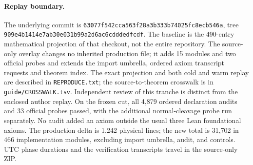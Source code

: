 \documentclass[11pt]{article}
\begin{document}
\paragraph{Replay boundary.}
The underlying commit is \texttt{63077f542cca563f28a3b333b74025fc8ecb546a}, tree
\texttt{909e4b1414e7ab30e031b99a2d6ac6cdddedfcdf}. The baseline is the 490-entry mathematical projection of that checkout, not the entire repository. The source-only overlay changes no inherited production file; it adds 15 modules and two official probes and extends the import umbrella, ordered axiom transcript requests and theorem index. The exact projection and both cold and warm replay are described in \verb|REPRODUCE.txt|; the source-to-theorem crosswalk is in \verb|guide/CROSSWALK.tsv|. Independent review of this tranche is distinct from the enclosed author replay.
On the frozen cut, all 4,879 ordered declaration audits and 33 official probes passed, with the additional normal-cleavage probe run separately. No audit added an axiom outside the usual three Lean foundational axioms. The production delta is 1,242 physical lines; the new total is 31,702 in 466 implementation modules, excluding import umbrella, audit, and controls. UTC phase durations and the verification transcripts travel in the source-only ZIP.
\end{document}
